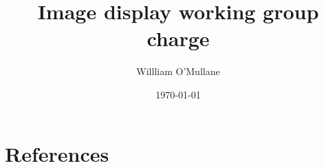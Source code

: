 \documentclass[DM,lsstdraft,toc]{lsstdoc}
\title{	Image display working group charge}
\author{%
Willliam O'Mullane
}
\date{\today}
\begin{document}
\maketitle





\appendix
\section{References } \label{sec:bib}
\renewcommand{\refname}{}


\printglossaries
\end{document}
